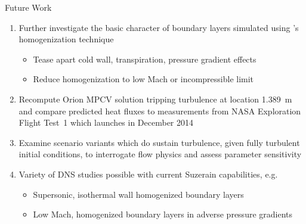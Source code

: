 \documentclass[mathserif]{beamer}
\begin{document}
\begin{frame}{Future Work}
    \begin{enumerate}
     \item Further investigate the basic character of boundary layers
           simulated using \citet{Topalian2014Spatiotemporal}'s
           homogenization technique
           \begin{itemize}
               \item Tease apart cold wall, transpiration, pressure gradient effects
               \item Reduce homogenization to low Mach or incompressible limit
           \end{itemize}
     \item Recompute Orion MPCV solution tripping turbulence at
           location 1.389~m and compare predicted heat fluxes to measurements
           from NASA Exploration Flight Test~1 which launches in December 2014
     \item Examine scenario variants which do sustain turbulence, given
           fully turbulent initial conditions, to interrogate flow physics
           and assess parameter sensitivity
     \item Variety of DNS studies possible with current Suzerain capabilities, e.g.
         \begin{itemize}
            \item Supersonic, isothermal wall homogenized boundary layers
            \item Low Mach, homogenized boundary layers in adverse pressure gradients
         \end{itemize}
    \end{enumerate}
\end{frame}
\end{document}
